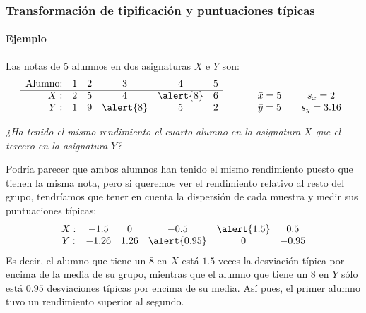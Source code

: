 \begin{frame}
\frametitle{Transformación de tipificación y puntuaciones típicas}
\framesubtitle{Ejemplo}
Las notas de 5 alumnos en dos asignaturas $X$ e $Y$ son:
\[
\begin{array}{rccccccccc}
\mbox{Alumno:} & 1 & 2 & 3 & 4 & 5\\ \cline{1-6}
X: & 2 & 5 & 4 & \alert{8} & 6 & \qquad & \bar x = 5 & \quad s_x = 2\\
Y: & 1 & 9 & \alert{8} & 5 & 2 & \qquad & \bar y = 5 & \quad s_y = 3.16\\
\end{array}
\]
\begin{center}
\emph{¿Ha tenido el mismo rendimiento el cuarto alumno en la asignatura $X$ que el tercero en la asignatura $Y$?}
\end{center}
Podría parecer que ambos alumnos han tenido el mismo rendimiento puesto que tienen la misma nota, pero si queremos ver el rendimiento relativo al resto del grupo, tendríamos que tener en cuenta la dispersión de cada muestra y medir sus puntuaciones típicas:
\[
\begin{array}{cccccc}
X: & -1.5 & 0 & -0.5 & \alert{1.5} & 0.5 \\
Y: & -1.26 & 1.26 & \alert{0.95} & 0 & -0.95\\
\end{array}
\]
Es decir, el alumno que tiene un 8 en $X$ está $1.5$ veces la desviación típica por encima de la media de su grupo, mientras que el alumno que tiene un 8 en $Y$ sólo está $0.95$ desviaciones típicas por encima de su media.
Así pues, el primer alumno tuvo un rendimiento superior al segundo.

\end{frame}
